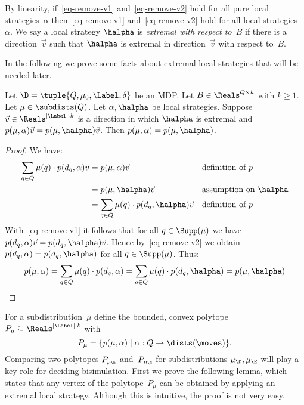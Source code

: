 By linearity, if~\eqref{eq-remove-v1} and~\eqref{eq-remove-v2} hold for all pure local strategies~$\alpha$ then~\eqref{eq-remove-v1} and~\eqref{eq-remove-v2} hold for all local strategies~$\alpha$.
We say a local strategy $\halpha$ is \emph{extremal with respect to~$B$} if there is a direction~$\vec{v}$ such that $\halpha$ is extremal in direction~$\vec{v}$ with respect to~$B$.

In the following we prove some facts about extremal local strategies that will be needed later.

\begin{lem}\label{lem-remove-v}
Let $\D = \tuple{Q,\mu_{0},\Label,\delta}$ be an MDP\@.
Let $B \in \Reals^{Q \times k}$ with $k \ge 1$.
Let $\mu \in \subdists(Q)$.
Let $\alpha, \halpha$ be local strategies.
Suppose $\vec{v} \in \Reals^{{|\Label|} \cdot k}$ is a direction in which $\halpha$ is extremal and
$p(\mu, \alpha) \vec{v} = p(\mu, \halpha) \vec{v}$.
Then $p(\mu, \alpha) = p(\mu, \halpha)$.
\end{lem}
\begin{proof}
We have:
\begin{align*}
\sum_{q \in Q} \mu(q) \cdot p(d_q, \alpha) \vec{v}
& = p(\mu, \alpha) \vec{v} && \text{definition of~$p$} \\
& = p(\mu, \halpha) \vec{v} && \text{assumption on~$\halpha$} \\
& = \sum_{q \in Q} \mu(q) \cdot p(d_q, \halpha) \vec{v} && \text{definition of~$p$}
\end{align*}
With~\eqref{eq-remove-v1} it follows that for all $q \in \Supp(\mu)$ we have $p(d_q, \alpha) \vec{v} = p(d_q, \halpha) \vec{v}$.
Hence by~\eqref{eq-remove-v2} we obtain $p(d_q, \alpha) = p(d_q, \halpha)$ for all $q \in \Supp(\mu)$.
Thus:
\[
p(\mu, \alpha)
= \sum_{q \in Q} \mu(q) \cdot p(d_q, \alpha)
= \sum_{q \in Q} \mu(q) \cdot p(d_q, \halpha)
= p(\mu, \halpha)
\qedhere
\]
\end{proof}

For a subdistribution~$\mu$ define the bounded, convex polytope $P_{\mu} \subseteq \Reals^{{|\Label|} \cdot k}$ with
\[
P_{\mu} = \{p(\mu, \alpha) \mid \alpha : Q \to \dists(\moves)\}.
\]
Comparing two polytopes $P_{\mu_\D}$ and~$P_{\mu_\E}$ for subdistributions $\mu_\D, \mu_\E$ will play a key role for deciding bisimulation.
First we prove the following lemma, which states that any vertex of the polytope~$P_\mu$ can be obtained by applying an extremal local strategy.
Although this is intuitive, the proof is not very easy.

